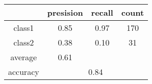 
    \begin{tabular}{ | c | c | c | c | }
	\hline
	         &presision & recall & count \\ \hline
	class1   & 0.85    & 0.97  & 170 \\ \hline
	class2   & 0.38    & 0.10  & 31 \\ \hline
	average  & 0.61    &        &       \\
	\hline
	accuracy & \multicolumn{3}{c|}{0.84}\\
	\hline
    \end{tabular}